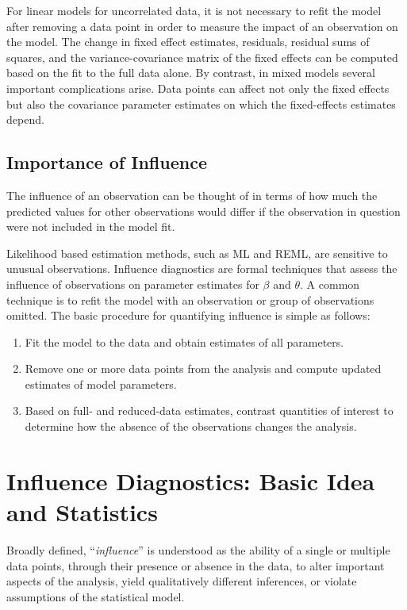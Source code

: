 \documentclass[12pt, a4paper]{report}
\theoremstyle{plain}
\theoremstyle{definition}
\theoremstyle{remark}
\begin{document}
For linear models for uncorrelated data, it is not necessary to refit the model after removing a data point in order to measure the impact of an observation on the model. The change in fixed effect estimates, residuals, residual sums of squares, and the variance-covariance matrix of the fixed effects can be computed based on the fit to the full data alone. By contrast, in mixed models several important complications arise. Data points can affect not only the fixed effects but also the covariance parameter estimates on which the fixed-effects estimates depend. 


\subsection{Importance of Influence}
The influence of an observation can be thought of in terms of how much the predicted values for other observations would differ if the observation in question were not included in the model fit.

Likelihood based estimation methods, such as ML and REML, are sensitive to unusual observations. Influence diagnostics are formal techniques that assess the influence of observations on parameter estimates for $\beta$ and $\theta$. A common technique is to refit the model with an observation or group of observations omitted. The basic procedure for quantifying influence is simple as follows:


\begin{enumerate}
	\item Fit the model to the data and obtain estimates of all parameters.
	\item Remove one or more data points from the analysis and compute updated estimates of model parameters.
	\item Based on full- and reduced-data estimates, contrast quantities of interest to determine how the absence of the observations changes the analysis.
\end{enumerate}	


\section{Influence Diagnostics: Basic Idea and Statistics} %
Broadly defined, ``\textit{influence}” is understood as the ability of a single or multiple data points, through their presence or absence in the data, to alter important aspects of the analysis, yield qualitatively different inferences, or
violate assumptions of the statistical model. 
\end{document}
